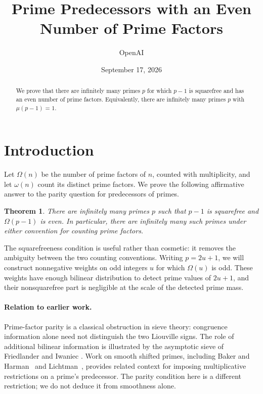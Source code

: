 \documentclass[11pt]{article}
\title{Prime Predecessors with an Even Number of Prime Factors}
\author{OpenAI}
\date{September 17, 2026}
\newcommand{\1}{\mathbf{1}}
\newtheorem{theorem}{Theorem}[section]
\theoremstyle{definition}
\theoremstyle{remark}
\numberwithin{equation}{section}
\begin{document}
\maketitle

\begin{abstract}
We prove that there are infinitely many primes $p$ for which $p-1$ is
squarefree and has an even number of prime factors. Equivalently,
there are infinitely many primes $p$ with $\mu(p-1)=1$.
\end{abstract}

\section{Introduction}\label{sec:introduction}

Let $\Omega(n)$ be the number of prime factors of $n$, counted with
multiplicity, and let $\omega(n)$ count its distinct prime factors.
We prove the following affirmative answer to the parity question for
predecessors of primes.

\begin{theorem}\label{thm:main}
There are infinitely many primes $p$ such that $p-1$ is squarefree
and $\Omega(p-1)$ is even. In particular, there are infinitely many
such primes under either convention for counting prime factors.
\end{theorem}

The squarefreeness condition is useful rather than cosmetic: it removes
the ambiguity between the two counting conventions. Writing $p=2u+1$,
we will construct nonnegative weights on odd integers $u$ for which
$\Omega(u)$ is odd. These weights have enough bilinear distribution
to detect prime values of $2u+1$, and their nonsquarefree part is
negligible at the scale of the detected prime mass.

\paragraph{Relation to earlier work.}
Prime-factor parity is a classical obstruction in sieve theory:
congruence information alone need not distinguish the two Liouville
signs. The role of additional bilinear information is illustrated by
the asymptotic sieve of Friedlander and Iwaniec
\cite[Section~1]{FriedlanderIwaniec}. Work on smooth shifted primes,
including Baker and Harman~\cite{BakerHarman} and
Lichtman~\cite{Lichtman}, provides related context for imposing
multiplicative restrictions on a prime's predecessor. The parity
condition here is a different restriction; we do not deduce it from
smoothness alone.
\end{document}
